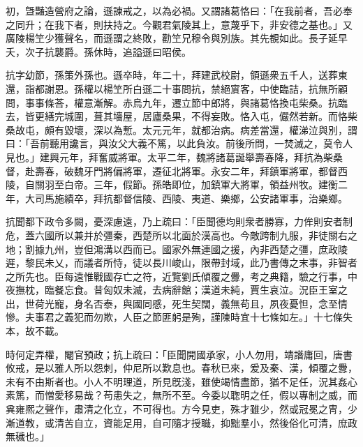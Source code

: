 \begin{pinyinscope}
 
 
 
 初，曁豔造營府之論，遜諫戒之，以為必禍。又謂諸葛恪曰：「在我前者，吾必奉之同升；在我下者，則扶持之。今觀君氣陵其上，意蔑乎下，非安德之基也。」又廣陵楊笁少獲聲名，而遜謂之終敗，勸笁兄穆令與別族。其先覩如此。長子延早夭，次子抗襲爵。孫休時，追謚遜曰昭侯。
 
 
 
 
 抗字幼節，孫策外孫也。遜卒時，年二十，拜建武校尉，領遜衆五千人，送葬東還，詣都謝恩。孫權以楊笁所白遜二十事問抗，禁絕賔客，中使臨詰，抗無所顧問，事事條荅，權意漸解。赤烏九年，遷立節中郎將，與諸葛恪換屯柴桑。抗臨去，皆更繕完城圍，葺其墻屋，居廬桑果，不得妄敗。恪入屯，儼然若新。而恪柴桑故屯，頗有毀壞，深以為慙。太元元年，就都治病。病差當還，權涕泣與別，謂曰：「吾前聽用讒言，與汝父大義不篤，以此負汝。前後所問，一焚滅之，莫令人見也。」建興元年，拜奮威將軍。太平二年，魏將諸葛誕舉壽春降，拜抗為柴桑督，赴壽春，破魏牙門將偏將軍，遷征北將軍。永安二年，拜鎮軍將軍，都督西陵，自關羽至白帝。三年，假節。孫皓即位，加鎮軍大將軍，領益州牧。建衡二年，大司馬施績卒，拜抗都督信陵、西陵、夷道、樂鄉，公安諸軍事，治樂鄉。
 
 
 
 
 抗聞都下政令多闕，憂深慮遠，乃上疏曰：「臣聞德均則衆者勝寡，力侔則安者制危，蓋六國所以兼并於彊秦，西楚所以北面於漢高也。今敵跨制九服，非徒關右之地；割據九州，豈但鴻溝以西而已。國家外無連國之援，內非西楚之彊，庶政陵遲，黎民未乂，而議者所恃，徒以長川峻山，限帶封域，此乃書傳之末事，非智者之所先也。臣每遠惟戰國存亡之符，近覽劉氏傾覆之釁，考之典籍，驗之行事，中夜撫枕，臨餐忘食。昔匈奴未滅，去病辭館；漢道未純，賈生哀泣。況臣王室之出，世荷光寵，身名否泰，與國同慼，死生契闊，義無苟且，夙夜憂怛，念至情慘。夫事君之義犯而勿欺，人臣之節匪躬是殉，謹陳時宜十七條如左。」十七條失本，故不載。
 
 
 
 
 時何定弄權，閹官預政；抗上疏曰：「臣聞開國承家，小人勿用，靖譖庸回，唐書攸戒，是以雅人所以怨刺，仲尼所以歎息也。春秋已來，爰及秦、漢，傾覆之釁，未有不由斯者也。小人不明理道，所見旣淺，雖使竭情盡節，猶不足任，況其姦心素篤，而憎愛移易哉？苟患失之，無所不至。今委以聦明之任，假以專制之威，而兾雍熈之聲作，肅清之化立，不可得也。方今見吏，殊才雖少，然或冠冕之冑，少漸道教，或清苦自立，資能足用，自可隨才授職，抑黜羣小，然後俗化可清，庶政無穢也。」
 

\end{pinyinscope}
